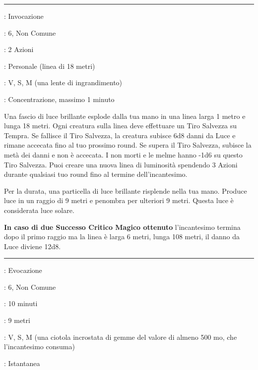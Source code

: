 \begin{multicols}{2}
\smallskip\noindent\rule{\linewidth}{2pt} \hypertarget{Bagliore Solare}{}\medskip{}
\noindent
\begin{description}[noitemsep, topsep=0pt, parsep=0pt, partopsep=0pt, leftmargin=0cm, labelwidth=2.8cm]
	\item[\textbf{Lista di Magia}]: Invocazione
	\item[\textbf{Livello}]: 6, Non Comune
	\item[\textbf{T. di Lancio}]: 2 Azioni
	\item[\textbf{Gittata}]: Personale (linea di 18 metri)
	\item[\textbf{Componenti}]: V, S, M (una lente di ingrandimento)
	\item[\textbf{Durata}]: Concentrazione, massimo 1 minuto
\end{description}

Una fascio di luce brillante esplode dalla tua mano in una linea larga 1 metro e lunga 18 metri. Ogni creatura sulla linea deve effettuare un Tiro Salvezza su Tempra. Se fallisce il Tiro Salvezza, la creatura subisce 6d8 danni da Luce e rimane accecata fino al tuo prossimo round. Se supera il Tiro Salvezza, subisce la metà dei danni e non è accecata. I non morti e le melme hanno -1d6 su questo Tiro Salvezza. Puoi creare una nuova linea di luminosità spendendo 3 Azioni durante qualsiasi tuo round fino al termine dell'incantesimo.

Per la durata, una particella di luce brillante risplende nella tua mano. Produce luce in un raggio di 9 metri e penombra per ulteriori 9 metri. Questa luce è considerata luce solare.

\textbf{In caso di due Successo Critico Magico ottenuto} l'incantesimo termina dopo il primo raggio ma la linea è larga 6 metri, lunga 108 metri, il danno da Luce diviene 12d8.

\smallskip\noindent\rule{\linewidth}{2pt} \hypertarget{Banchetto degli Eroi}{}\medskip{}
\noindent
\begin{description}[noitemsep, topsep=0pt, parsep=0pt, partopsep=0pt, leftmargin=0cm, labelwidth=2.8cm]
	\item[\textbf{Lista di Magia}]: Evocazione
	\item[\textbf{Livello}]: 6, Non Comune
	\item[\textbf{T. di Lancio}]: 10 minuti
	\item[\textbf{Gittata}]: 9 metri
	\item[\textbf{Componenti}]: V, S, M (una ciotola incrostata di gemme del valore di almeno 500 mo, che l'incantesimo consuma)
	\item[\textbf{Durata}]: Istantanea
\end{description}


\end{multicols}
